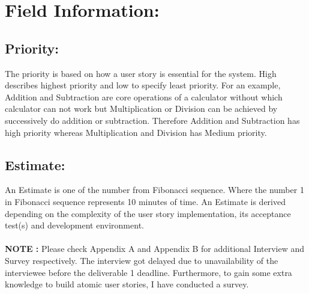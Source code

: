 \documentclass{article}
\newcommand\tab[1][1cm]{\hspace*{#1}}
\begin{document}
\section{Field Information:}
\subsection{Priority: }
\tab[1.2cm] The priority is based on how a user story is essential for the system. High describes highest priority and low to specify least priority.
For an example, Addition and Subtraction are core operations of a calculator without which calculator can not work but Multiplication or Division can be achieved by successively do addition or subtraction. Therefore Addition and Subtraction has high priority whereas Multiplication and Division has Medium priority.
\subsection{Estimate: }
\tab[1.2cm] An Estimate is one of the number from Fibonacci sequence. Where the number 1 in Fibonacci sequence represents 10 minutes of time. An Estimate is derived depending on the complexity of the user story implementation, its acceptance test(s) and development environment.
\\ \\ 
\noindent
\textbf{NOTE : } Please check Appendix A and Appendix B for additional Interview and Survey respectively. The interview got delayed due to unavailability of the interviewee before the deliverable 1 deadline. Furthermore, to gain some extra knowledge to build atomic user stories, I have conducted a survey. 

\newpage
\end{document}
